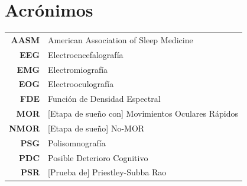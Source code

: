 \documentclass[12pt,letterpaper]{mitthesis}
\begin{document}
\chapter*{Acr\'onimos}

\begin{tabular}{rl}
\textbf{AASM} & American Association of Sleep Medicine
\\
\textbf{EEG} & Electroencefalograf\'ia
\\
\textbf{EMG} & Electromiograf\'ia
\\
\textbf{EOG} & Electrooculograf\'ia
\\
\textbf{FDE} & Funci\'on de Densidad Espectral
\\
\textbf{MOR} & [Etapa de sue\~no con] Movimientos Oculares R\'apidos
\\
\textbf{NMOR}& [Etapa de sue\~no] No-MOR
\\
\textbf{PSG} & Polisomnograf\'ia
\\
\textbf{PDC} & Posible Deterioro Cognitivo
\\
\textbf{PSR} & [Prueba de] Priestley-Subba Rao
\\
\end{tabular}

\newpage


\thispagestyle{empty}

\tableofcontents
\newpage


\setcounter{page}{1}

\end{document}
